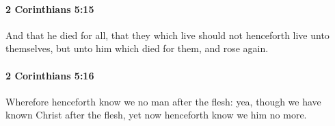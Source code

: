 		\paragraph{2 Corinthians 5:15} %
			\label{2CORINTHIANS-5-15}

			And that he died for all, that they which live should not henceforth live unto themselves, but unto him which died for them, and rose again.

			\begin{framed}
			\scriptsize
				\begin{compactdesc}
					\item[SBLG] 
				\end{compactdesc}
			\end{framed}

		\paragraph{2 Corinthians 5:16} %
			\label{2CORINTHIANS-5-16}

			Wherefore henceforth know we no man after the flesh: yea, though we have known Christ after the flesh, yet now henceforth know we him no more.

